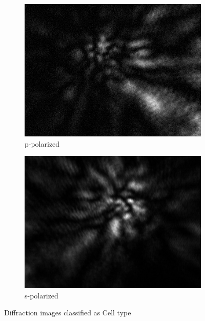 \begin{figure}[!h]
\begin{subfigure}[b]{0.2\textwidth}
    \includegraphics[width=\textwidth]{diffraction_image/2015040117594700185-1}
    \caption{p-polarized}
  \end{subfigure}
  \begin{subfigure}[b]{0.2\textwidth}
    \includegraphics[width=\textwidth]{diffraction_image/2015040117594700185-2}
    \caption{s-polarized}
  \end{subfigure}
  \caption{Diffraction images classified as Cell type}
\end{figure}
